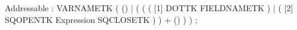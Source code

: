 %
%
%
\begin{rail}
Addressable : VARNAMETK
              ( ()
              | ( ( ( [1] DOTTK FIELDNAMETK )
                  | ( [2] SQOPENTK Expression SQCLOSETK )
                  ) + () )
              ) ;
\end{rail}
